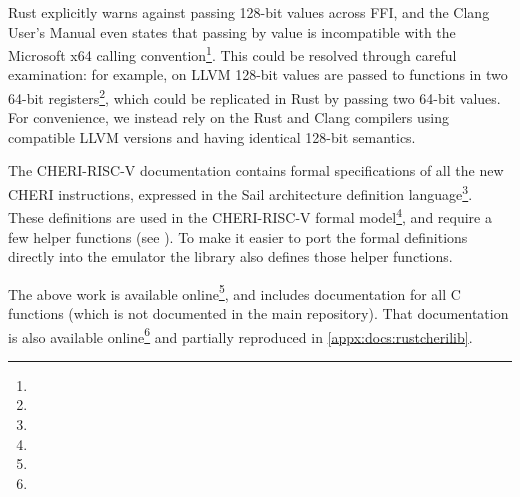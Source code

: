 Rust explicitly warns against passing 128-bit values across FFI, and the Clang User's Manual even states that passing  by value is incompatible with the Microsoft x64 calling convention\footnote{}.
This could be resolved through careful examination: for example, on LLVM 128-bit values are passed to functions in two 64-bit registers\footnote{}, which could be replicated in Rust by passing two 64-bit values.
For convenience, we instead rely on the Rust and Clang compilers using compatible LLVM versions and having identical 128-bit semantics.

The CHERI-RISC-V documentation contains formal specifications of all the new CHERI instructions, expressed in the Sail architecture definition  language\footnote{}.
These definitions are used in the CHERI-RISC-V formal model\footnote{}, and require a few helper functions (see \cite[Chapter 8.2]{TR-951}).
To make it easier to port the formal definitions directly into the emulator the  library also defines those helper functions.

The above work is available online\footnote{}, and includes documentation for all C functions (which is not documented in the main repository).
That documentation is also available online\footnote{} and partially reproduced in \cref{appx:docs:rustcherilib}.


